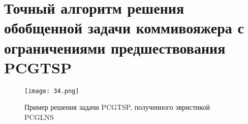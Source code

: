 
\chapter{
  Точный алгоритм решения
  обобщенной задачи коммивояжера
  с ограничениями предшествования
  PCGTSP
}
\label{ch:pcgtsp}

\begin{figure}
  \centering
  \texttt{[image: 34.png]}
  \caption{Пример решения задачи PCGTSP, полученного эвристикой PCGLNS}
  \label{fig:pcgtsp.svg}
\end{figure}





